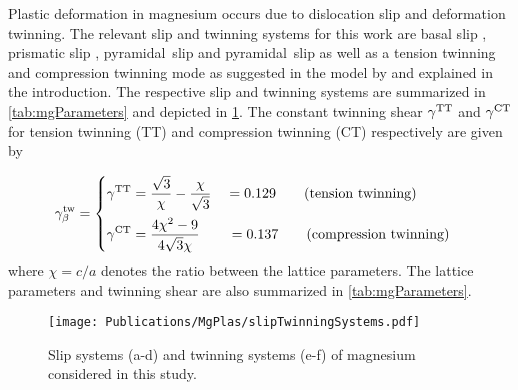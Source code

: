   Plastic deformation in magnesium occurs due to dislocation slip and deformation twinning. The relevant slip and twinning systems for this work are basal slip , prismatic slip , pyramidal~\pyra slip  and pyramidal~\pyrac slip  as well as a tension twinning  and compression twinning  mode as suggested in the model by  and explained in the introduction. The respective slip and twinning systems are summarized in \cref{tab:mgParameters} and depicted in \cref{fig:SlipTwinningSystems}. The constant twinning shear $\gamma^{\rm TT}$ and $\gamma^{\rm CT}$ for tension twinning (TT) and compression twinning (CT) respectively are given by\supercite{yoo1981slip}
  
  \begin{equation}
    \gamma^{\rm tw}_{\beta} = \begin{cases} 
      \displaystyle\gamma^{\rm TT} = \frac{\sqrt{3}}{\chi} - \frac{\chi}{\sqrt{3}} \quad = 0.129 \qquad \text{(tension twinning)}\\[10pt]
      \displaystyle\gamma^{\rm CT} = \frac{4 \chi^2-9}{4\sqrt{3}\chi} \qquad = 0.137 \qquad \text{(compression twinning)}
    \end{cases}
    \label{eq:twinAngles}
  \end{equation}
  where $\chi=c/a$ denotes the ratio between the lattice parameters. The lattice parameters and twinning shear are also summarized in \cref{tab:mgParameters}.

  \begin{figure}[h!]
    \texttt{[image: Publications/MgPlas/slipTwinningSystems.pdf]}
    \caption{Slip systems (a-d) and twinning systems (e-f) of magnesium considered in this study.}
    \label{fig:SlipTwinningSystems}
  \end{figure}



